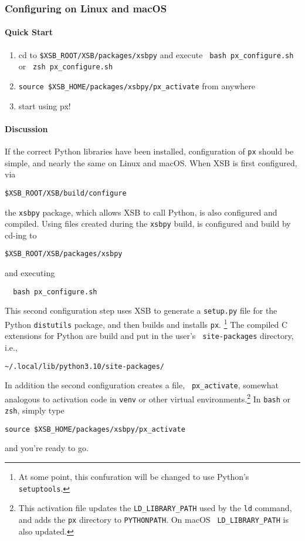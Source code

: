 \subsubsection{Configuring \px{} on Linux and macOS}

\paragraph{Quick Start}
\begin{enumerate}
\item cd to {\tt \$XSB\_ROOT/XSB/packages/xsbpy} and execute {\tt
  bash px\_configure.sh} or {\tt
  zsh px\_configure.sh}
\item {\tt source \$XSB\_HOME/packages/xsbpy/px\_activate} from anywhere
\item start using px!
\end{enumerate}

\paragraph{Discussion}
If the correct Python libraries have been installed, configuration of
{\tt px} should be simple, and nearly the same on Linux and
macOS.  When XSB is first configured, via
\begin{verbatim}
$XSB_ROOT/XSB/build/configure
\end{verbatim}
the {\tt xsbpy} package, which allows XSB to call Python, is also
configured and compiled.  Using files created during the {\tt xsbpy}
build, \px{} is configured and build by cd-ing to
\begin{verbatim}
$XSB_ROOT/XSB/packages/xsbpy
\end{verbatim}
\noindent
and executing
\begin{verbatim}
  bash px_configure.sh
\end{verbatim}
This second configuration step uses XSB to generate a {\tt setup.py}
file for the Python {\tt distutils} package, and then builds and
installs {\tt px}.  \footnote{At some point, this confuration will be
  changed to use Python's {\tt setuptools}.}  The compiled C
extensions for Python are build and put in the user's {\tt
  site-packages} directory, i.e.,
\begin{verbatim}
~/.local/lib/python3.10/site-packages/
\end{verbatim}
In addition the second configuration creates a file, {\tt
  px\_activate}, somewhat analogous to activation code in {\tt venv}
or other virtual environments.\footnote{This activation file updates
  the {\tt LD\_LIBRARY\_PATH} used by the {\tt ld} command, and adds
  the {\tt px} directory to {\tt PYTHONPATH}.  On macOS {\tt
    LD\_LIBRARY\_PATH} is also updated.} In {\tt bash} or {\tt zsh},
simply type
\begin{verbatim}
source $XSB_HOME/packages/xsbpy/px_activate
\end{verbatim}
and you're ready to go.

